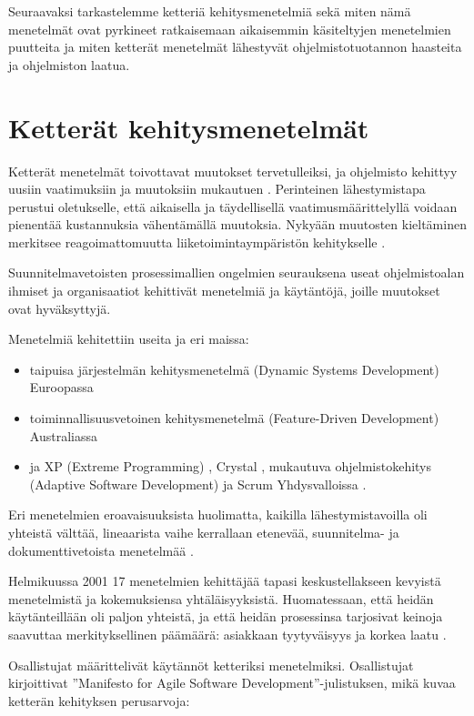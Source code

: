 \documentclass[finnish]{tktltiki2}
\theoremstyle{definition}
\theoremstyle{remark}
\begin{document}
Seuraavaksi tarkastelemme ketteriä kehitysmenetelmiä sekä miten nämä menetelmät ovat pyrkineet ratkaisemaan aikaisemmin käsiteltyjen menetelmien puutteita ja miten ketterät menetelmät lähestyvät ohjelmistotuotannon haasteita ja ohjelmiston laatua. 

\section{Ketterät kehitysmenetelmät}

Ketterät menetelmät toivottavat muutokset tervetulleiksi, ja ohjelmisto kehittyy uusiin vaatimuksiin ja muutoksiin mukautuen \cite{WIC03}. Perinteinen lähestymistapa perustui oletukselle, että aikaisella ja täydellisellä vaatimusmäärittelyllä voidaan pienentää kustannuksia vähentämällä muutoksia. Nykyään muutosten kieltäminen merkitsee reagoimattomuutta liiketoimintaympäristön kehitykselle \cite{HIC01}.

Suunnitelmavetoisten prosessimallien ongelmien seurauksena useat ohjelmistoalan ihmiset ja organisaatiot kehittivät menetelmiä ja käytäntöjä, joille muutokset ovat hyväksyttyjä. 

Menetelmiä kehitettiin useita ja eri maissa: 
\begin{itemize}
 \item taipuisa järjestelmän kehitysmenetelmä (Dynamic Systems Development) Euroopassa
 \item toiminnallisuusvetoinen kehitysmenetelmä (Feature-Driven Development) Australiassa
 \item ja XP (Extreme Programming) \cite{BEC99}, Crystal \cite{COC05}, mukautuva ohjelmistokehitys (Adaptive Software Development) ja Scrum \cite{SCH09} Yhdysvalloissa \cite{WIC03}.
\end{itemize}

Eri menetelmien eroavaisuuksista huolimatta, kaikilla lähestymistavoilla oli yhteistä välttää, lineaarista vaihe kerrallaan etenevää, suunnitelma- ja dokumenttivetoista menetelmää \cite{LAB03}.

Helmikuussa 2001 17 menetelmien kehittäjää tapasi keskustellakseen kevyistä menetelmistä ja kokemuksiensa yhtäläisyyksistä. Huomatessaan, että heidän käytänteillään oli paljon yhteistä, ja että heidän prosessinsa tarjosivat keinoja saavuttaa merkityksellinen päämäärä: asiakkaan tyytyväisyys ja korkea laatu \cite{WIC03}. 

Osallistujat määrittelivät käytännöt ketteriksi menetelmiksi.
Osallistujat kirjoittivat ''Manifesto for Agile Software Development''-julistuksen, mikä kuvaa ketterän kehityksen perusarvoja:
\end{document}
